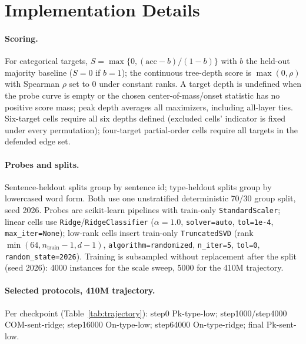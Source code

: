 \documentclass[11pt]{article}
\begin{document}
\section{Implementation Details}
\label{app:impl}

\paragraph{Scoring.} For categorical targets, $S=\max\{0,(\mathrm{acc}-b)/(1-b)\}$ with $b$ the held-out majority baseline ($S=0$ if $b=1$); the continuous tree-depth score is $\max(0,\rho)$ with Spearman $\rho$ set to $0$ under constant ranks. A target depth is undefined when the probe curve is empty or the chosen center-of-mass/onset statistic has no positive score mass; peak depth averages all maximizers, including all-layer ties. Six-target cells require all six depths defined (excluded cells' indicator is fixed under every permutation); four-target partial-order cells require all targets in the defended edge set.

\paragraph{Probes and splits.} Sentence-heldout splits group by sentence id; type-heldout splits group by lowercased word form. Both use one unstratified deterministic 70/30 group split, seed 2026. Probes are scikit-learn pipelines with train-only \texttt{StandardScaler}; linear cells use \texttt{Ridge}/\texttt{RidgeClassifier} ($\alpha=1.0$, \texttt{solver=auto}, \texttt{tol=1e-4}, \texttt{max\_iter=None}); low-rank cells insert train-only \texttt{TruncatedSVD} (rank $\min(64,n_{\mathrm{train}}-1,d-1)$, \texttt{algorithm=randomized}, \texttt{n\_iter=5}, \texttt{tol=0}, \texttt{random\_state=2026}). Training is subsampled without replacement after the split (seed 2026): 4000 instances for the scale sweep, 5000 for the 410M trajectory.

\paragraph{Selected protocols, 410M trajectory.} Per checkpoint (Table~\ref{tab:trajectory}): step0 Pk-type-low; step1000/step4000 COM-sent-ridge; step16000 On-type-low; step64000 On-type-ridge; final Pk-sent-low.
\end{document}
